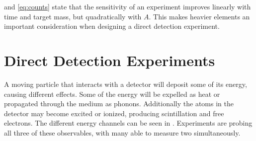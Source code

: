 \noindent {} and \eqref{eq:counts} state that the sensitivity of an experiment improves linearly with time and
target mass, but quadratically with $A$.  This makes heavier elements an important consideration when designing a direct detection
experiment.



















 \section[Direct Detection Experiments][Direct Detection Experiments]{Direct Detection Experiments}
 \label{sec:direct_detect}
 A moving particle that interacts with a detector will deposit some of its energy, causing different effects.  Some of the energy
 will be expelled as heat or propagated through the medium as phonons.  Additionally the atoms in the detector may become
 excited or ionized, producing scintillation and free electrons.  The different energy channels can be seen in
 .  Experiments are probing all three of these observables, with many able to measure two
 simultaneously.
 

